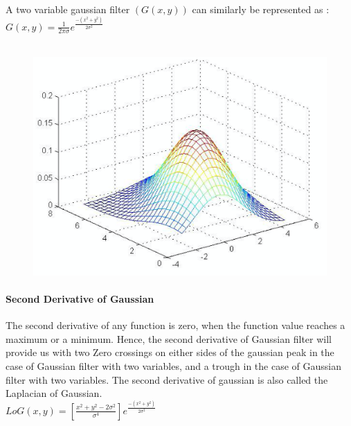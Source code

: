 \documentclass{article}
\begin{document}
		A two variable gaussian filter $(G(x,y))$ can similarly be represented as : \\ 

		$G(x,y) = \frac{1}{2\pi\sigma}e^{\frac{-(x^2 + y^2)}{2\sigma^2}}$ \\ \\		
		\begin{figure}[H]
			\center
			\includegraphics[width=0.3\linewidth]{images/2d_gaussian.png}
			\label{fig:test11}
		\end{figure}
		\paragraph{Second Derivative of Gaussian}
		The second derivative of any function is zero, when the function value reaches a maximum or a minimum. Hence, the second derivative of Gaussian filter will provide us with two Zero crossings on either sides of the gaussian peak in the case of Gaussian filter with two variables, and a trough in the case of Gaussian filter with two variables. The second derivative of gaussian is also called the Laplacian of Gaussian.\\ 
		$LoG(x,y) = [\frac{x^2 + y^2 - 2\sigma^2}{\sigma^4}]e^{\frac{-(x^2 + y^2)}{2\sigma^2}}$
\end{document}
